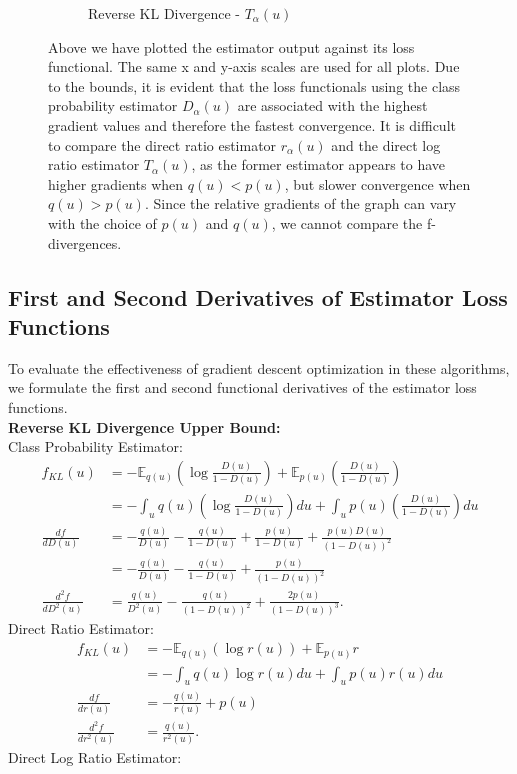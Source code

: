 \documentclass[honours,12pt]{unswthesis}
\newcommand{\E}{\mathbb{E}}
\numberwithin{equation}{section}
\theoremstyle{definition}
\begin{document}
\begin{figure}[h!]
\begin{subfigure}{0.49\textwidth}
\caption{Reverse KL Divergence - $T_\alpha(u)$}
\end{subfigure}
\caption{\small Above we have plotted the estimator output against its loss functional. The same x and y-axis scales are used for all plots. Due to the bounds, it is evident that the loss functionals using the class probability estimator $D_\alpha(u)$ are associated with the highest gradient values and therefore the fastest convergence. It is difficult to compare the direct ratio estimator $r_\alpha(u)$ and the direct log ratio estimator $T_\alpha(u)$, as the former estimator appears to have higher gradients when $q(u)<p(u)$, but slower convergence when $q(u)>p(u)$. Since the relative gradients of the graph can vary with the choice of $p(u)$ and $q(u)$, we cannot compare the f-divergences.}
\end{figure}
\subsection{First and Second Derivatives of Estimator Loss Functions}
To evaluate the effectiveness of gradient descent optimization in these algorithms, we formulate the first and second functional derivatives of the estimator loss functions.\\
\textbf{Reverse KL Divergence Upper Bound:}\\
Class Probability Estimator:
\begin{align*}
f_{KL}(u)&=-\E_{q(u)}\left(\log \frac{D(u)}{1-D(u)}\right)+\E_{p(u)}\left(\frac{D(u)}{1-D(u)}\right)\\
&=-\int_u q(u)\left(\log \frac{D(u)}{1-D(u)}\right)du+\int_u p(u)\left(\frac{D(u)}{1-D(u)}\right)du\\
\frac{df}{dD(u)}&=-\frac{q(u)}{D(u)}-\frac{q(u)}{1-D(u)}+\frac{p(u)}{1-D(u)}+\frac{p(u)D(u)}{(1-D(u))^2}\\
&=-\frac{q(u)}{D(u)}-\frac{q(u)}{1-D(u)}+\frac{p(u)}{(1-D(u))^2}\\
\frac{d^2f}{dD^2(u)}&=\frac{q(u)}{D^2(u)}-\frac{q(u)}{(1-D(u))^2}+\frac{2p(u)}{(1-D(u))^3}.
\end{align*}
\newpage
Direct Ratio Estimator:
\begin{align*}
f_{KL}(u)&=-\E_{q(u)}(\log r(u))+\E_{p(u)}r\\
&=-\int_u q(u)\log r(u) du+\int_u p(u)r(u)du\\
\frac{df}{dr(u)}&=-\frac{q(u)}{r(u)}+p(u)\\
\frac{d^2f}{dr^2(u)}&=\frac{q(u)}{r^2(u)}.
\end{align*}
Direct Log Ratio Estimator:
\end{document}
